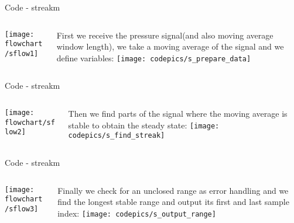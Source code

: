 \documentclass{beamer}
\begin{document}
\begin{frame}{Code - streakm}
	\begin{columns}[T] %
		\begin{column}[]{.05\textwidth}
			\texttt{[image: flowchart/sflow1]}
		\end{column}%
		\hfill%
		\begin{column}{.8\textwidth}
			\small{First we receive the pressure signal(and also moving average window length), we take a moving average of the signal and we define variables:}
			\newline
			\newline
			\texttt{[image: codepics/s\_prepare\_data]}
		\end{column}%
	\end{columns}
\end{frame}

\begin{frame}{Code - streakm}
	\begin{columns}[T] %
		\begin{column}[]{.05\textwidth}
			\texttt{[image: flowchart/sflow2]}
		\end{column}%
		\hfill%
		\begin{column}{.8\textwidth}
			\small{Then we find parts of the signal where the moving average is stable to obtain the steady state:}
			\newline
			\newline
			\texttt{[image: codepics/s\_find\_streak]}
		\end{column}%
	\end{columns}
\end{frame}

\begin{frame}{Code - streakm}
\begin{columns}[T] %
	\begin{column}[]{.05\textwidth}
		\texttt{[image: flowchart/sflow3]}
	\end{column}%
	\hfill%
	\begin{column}{.8\textwidth}
		\small{Finally we check for an unclosed range as error handling and we find the longest stable range and output its first and last sample index:}
		\newline
		\newline
		\texttt{[image: codepics/s\_output\_range]}
	\end{column}%
\end{columns}
\end{frame}
\end{document}
